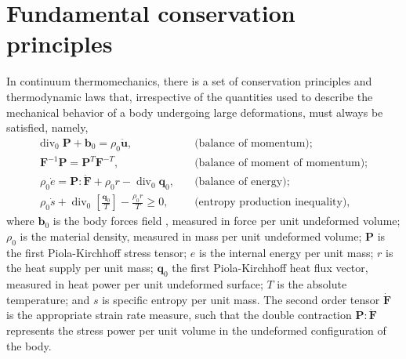 \section{Fundamental conservation principles} \label{sec:fundamental_conservation_princ}

In continuum thermomechanics, there is a set of conservation principles and thermodynamic laws that, irrespective of the quantities used to describe the mechanical behavior of a body undergoing large deformations, must always be satisfied, namely,
\enlargethispage{\baselineskip}
\begin{align}
  \text{div}_0\;\bm{P} + \bm{b}_0 = \rho_0 \ddot{\bm{u}},\quad & \text{(balance of momentum)};
                                                                 \label{eq:material_equilibrium}\\
  \bm{F}^{-1}\bm{P} = \bm{P}^{T}\bm{F} ^{-T},\quad & \text{(balance of moment of momentum)};\\
  \rho_0 \dot e = \bm{P} :\dot{\bm{F}} + \rho_0 r -\operatorname{div}_0 \bm{q}_0,\quad & \text{(balance of energy)};\label{eq:balance_energy}\\
  \rho_0 \dot s + \operatorname{div}_0 \left[\frac{\bm{q}_0}{T}\right] - \frac{\rho_0 r}{T} \geq 0,\quad & \text{(entropy production inequality)}\label{eq:entropy_production},
\end{align}
where $\bm{b}_0$ is the body forces field , measured in force per unit undeformed volume; $\rho_0$ is the material density, measured in mass per unit undeformed volume; \(\bm{P}\) is the first Piola-Kirchhoff stress tensor; \(e\) is the internal energy per unit mass; \(r\) is the heat supply per unit mass; \(\bm{q}_0\) the first Piola-Kirchhoff heat flux vector, measured in heat power per unit undeformed surface; $T$ is the absolute temperature; and $s$ is specific entropy per unit mass.
The second order tensor $\dot{\bm{F}}$ is the appropriate strain rate measure, such that the double contraction $\bm{P}:\dot{\bm{F}}$ represents the stress power per unit volume in the undeformed configuration of the body.

